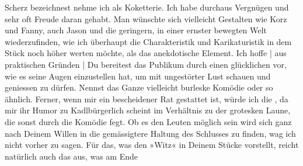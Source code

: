 \begin{ledgroupsized}[t]{13cm}
               Scherz bezeichnest nehme ich als Koketterie. Ich habe durchaus Vergnügen und sehr oft
               Freude daran gehabt. Man wünschte sich vielleicht Gestalten wie Korz und Fanny, auch Jason und die geringern, in einer ernster bewegten Welt
               wiederzufinden, wie ich überhaupt die Charakteristik und Karikaturistik in dem Stück
               noch höher werten möchte, als das anekdotische Element. Ich hoffe | aus praktischen
               Gründen | Du bereitest das Publikum durch einen glücklichen \label{K_L01721-1v}\label{K_L01721-1h}{ }\label{T_L01721-1v}\label{T_L01721-1h} vor, wie es seine Augen
               einzustellen hat, um mit ungestörter Lust schauen und geniessen zu dürfen. Nennst das
               Ganze vielleicht burleske Komödie oder so ähnlich. Ferner, wenn mir ein bescheidener
               Rat gestattet ist, würde ich die \label{K_L01721-2v}\label{K_L01721-2h}, da mir ihr Humor zu Kadlbürgerlich scheint im Verhältnis zu der grotesken Laune, die sonst durch
               die Komödie fegt. Ob es den Leuten möglich sein wird sich ganz nach Deinem {\pb}Willen in die
               gemässigtere Haltung des Schlusses zu finden, wag ich nicht vorher zu sagen. Für das,
               was den »Witz« in Deinem Stücke vorstellt, reicht natürlich auch das aus, was am Ende

\end{ledgroupsized}
